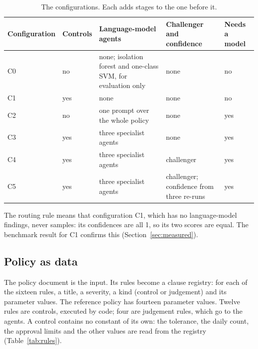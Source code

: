\documentclass[11pt,a4paper]{article}
\begin{document}
\begin{table}[htbp]
\caption{The configurations. Each adds stages to the one before it.}
\label{tab:configs}
\centering
\small
\begin{tabular}{L{2.2cm}L{1.5cm}L{4.2cm}L{4.0cm}L{2.2cm}}
\toprule
Configuration & Controls & Language-model agents & Challenger and confidence & Needs a model \\
\midrule
C0 & no & none; isolation forest and one-class SVM, for evaluation only & none & no \\
C1 & yes & none & none & no \\
C2 & no & one prompt over the whole policy & none & yes \\
C3 & yes & three specialist agents & none & yes \\
C4 & yes & three specialist agents & challenger & yes \\
C5 & yes & three specialist agents & challenger; confidence from three re-runs & yes \\
\bottomrule
\end{tabular}
\end{table}

The routing rule means that configuration C1, which has no language-model findings, never samples: its confidences are all 1, so its two scores are equal. The benchmark result for C1 confirms this (Section~\ref{sec:measured}).

\subsection{Policy as data}
The policy document is the input. Its rules become a clause registry: for each of the sixteen rules, a title, a severity, a kind (control or judgement) and its parameter values. The reference policy has fourteen parameter values. Twelve rules are controls, executed by code; four are judgement rules, which go to the agents. A control contains no constant of its own: the tolerance, the daily count, the approval limits and the other values are read from the registry (Table~\ref{tab:rules}).
\end{document}
